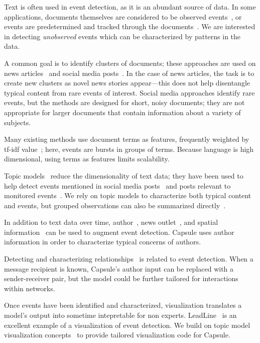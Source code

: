 Text is often used in event detection, as it is an abundant source of data.  
In some applications, documents themselves are considered to be observed events~\cite{mccallum1998comparison,peng2007event}, or events are predetermined and tracked through the documents~\cite{yang2000improving,VanDam:2012}.  We are interested in detecting \emph{unobserved} events which can be characterized by patterns in the data.

A common goal is to identify clusters of documents; these approaches are used on news articles~\cite{zhao2012novel,zhao2007temporal,zhang2002novelty,li2005probabilistic,wang2007mining,allan1998line} and social media posts~\cite{VanDam:2012,lau2012line,jackoway2011identification,sakaki2010earthquake,reuter2012event,becker2010learning,sayyadi2009event}.  
In the case of news articles, the task is to create new clusters as novel news stories appear---this does not help disentangle typical content from rare events of interest.
Social media approaches identify rare events, but the methods are designed for short, noisy documents; they are not appropriate for larger documents that contain information about a variety of subjects.

Many existing methods use document terms as features, frequently weighted by tf-idf value~\cite{fung2005parameter,kumaran2004text,brants2003system,das2011dynamic,zhao2007temporal,zhao2012novel}; here, events are bursts in groups of terms.  Because language is high dimensional, using terms as features limits scalability.

Topic models~\cite{Blei:2012} reduce the dimensionality of text data; they have been used to help detect events mentioned in social media posts~\cite{lau2012line,dou2012leadline} and posts relevant to monitored events~\cite{VanDam:2012}.
We rely on topic models to characterize both typical content and events, but grouped observations can also be summarized directly~\cite{peng2007event,chakrabarti2011event,gao2012joint}.

In addition to text data over time, author~\cite{zhao2007temporal}, news outlet~\cite{wang2007mining}, and spatial information~\cite{Neill:2005,mathioudakis2010identifying,liu2011using} can be used to augment event detection.  Capsule uses author information in order to characterize typical concerns of authors.

Detecting and characterizing relationships~\cite{schein2015bayesian,linderman2014discovering,das2011dynamic} is related to event detection.  When a message recipient is known, Capsule's author input can be replaced with a sender-receiver pair, but the model could be further tailored for interactions within networks.

Once events have been identified and characterized, visualization translates a model's output into sometime intepretable for non experts.  LeadLine~\cite{dou2012leadline} is an excellent example of a visualization of event detection.  We build on topic model visualization concepts~\cite{chaney2012visualizing} to provide tailored visualization code for Capsule.